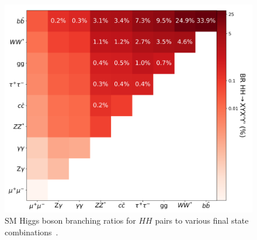 \begin{figure}[!htp]
    \centering
    \includegraphics[width=.75\textwidth]{chapters/chapter1_theory/images/hh-brs.png}
    \caption[\gls{SM} Higgs boson branching ratios for $HH$ pairs to various final state combinations]{\gls{SM} Higgs boson branching ratios for $HH$ pairs to various final state combinations~\cite{hh-whitepaper}.}
    \label{fig:hh-brs}
\end{figure}